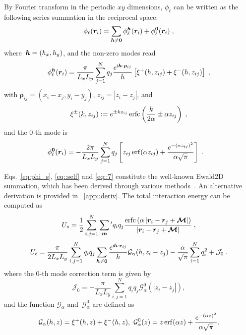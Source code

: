 \begin{lem}\label{thm::SpectralExpansion}
	By Fourier transform in the periodic $xy$ dimensions, $\phi_{\ell}$ can be written as the following series summation in the reciprocal space:
	\begin{equation}\label{eq::7} 
		\phi_{\ell}(\bm{r}_{i}) = \sum_{\boldsymbol{h} \neq \bm{0}} \phi_{\ell}^{\boldsymbol{h}}(\bm{r}_{i}) + \phi_{\ell}^{\bm{0}}(\bm{r}_{i})\;,
	\end{equation}
	where~$\boldsymbol{h} = (h_x, h_y)$, and the non-zero modes read
	\begin{equation}\label{eq:philk}
		\phi_{\ell}^{\boldsymbol{h}}(\bm{r}_{i}) = \frac{\pi}{L_x L_y} \sum_{j = 1}^N q_{j} \frac{e^{\mathrm{i} \boldsymbol{h} \cdot \boldsymbol{\rho}_{ij}}}{h} \left[\xi^{+}(h, z_{ij})+\xi^{-}(h, z_{ij})\right]\;,
	\end{equation}
	with $\bm{\rho}_{ij}=(x_{i}-x_{j},y_{i}-y_{j})$, $z_{ij}=|z_{i}-z_{j}|$, and
	\begin{equation}\label{eq::9}
		\xi^{\pm}(k, z_{ij}) := e^{\pm k z_{ij}} \operatorname{erfc} \left( \frac{k}{2 \alpha} \pm \alpha z_{ij}\right)\;,
	\end{equation} 
	and the 0-th mode is
	\begin{align}\label{eq:phil0}
		\phi_{\ell}^{\bm{0}}(\bm{r}_{i}) &= -\frac{2\pi}{L_x L_y} \sum_{j = 1}^N q_{j} \left[ {z_{ij}} \operatorname{erf}(\alpha {z_{ij}}) + \frac{e^{-(\alpha z_{ij})^2}}{\alpha \sqrt{\pi}}  \right]\;.
	\end{align}
\end{lem}

Eqs.~\eqref{eq:phi_s}, \eqref{eq::self} and \eqref{eq::7} constitute the well-known Ewald2D summation, which has been derived through various methods~\cite{parry1975electrostatic,tornberg2016ewald,heyes1977molecular,de1979electrostatic,PhysRevB.61.6706}.
An alternative derivation is provided in ~\ref{app::deriv}.
The total interaction energy can be computed as
\begin{equation}\label{eq::Us_Ewald2D}
    U_{s} =  \frac{1}{2} \sum_{i,j=1}^N \sum_{\bm{m}}{}^\prime q_i q_{j} \frac{\text{erfc}\left(\alpha \left|\bm{r}_i - \bm{r}_{j} + \boldsymbol{\mathcal{M}}\right|\right)}{\left|\bm{r}_i-\bm{r}_{j} + \boldsymbol{\mathcal{M}}\right|}\;,
\end{equation}
\begin{equation}\label{eq::Ul_Ewald2D}
    U_{\ell} =  \frac{\pi}{2L_xL_y}\sum_{i, j=1}^N  q_iq_{j} \sum_{\boldsymbol{h}\neq \boldsymbol{0}}\frac{e^{\mathsf i \boldsymbol{h}\cdot \boldsymbol{r}_{ij}}}{h}\mathcal{G}_{\alpha}(h,z_i - z_{j})  - \frac{\alpha}{\sqrt{\pi}}\sum_{i=1}^{N}q_i^2+\mathcal{J}_0\;.
\end{equation}
where the 0-th mode correction term is given by
\begin{equation}\label{eq::J0_Ewald2D}
\mathcal J_0 = -\frac{\pi}{L_xL_y}\sum_{i,j=1}^{N} q_iq_{j}\mathcal{G}_{\alpha}^0(|z_i-z_{j}|),
\end{equation}
and the function $\mathcal{G}_{\alpha}$ and~$\mathcal{G}_{\alpha}^0$ are defined as
\begin{equation}\label{eq::G_Ewald2D}
    \mathcal{G}_{\alpha}(h,z) = \xi^{+}(h, z)+\xi^{-}(h, z),~\mathcal{G}_{\alpha}^0(z) = {z} \operatorname{erf}(\alpha {z}) + \frac{e^{-(\alpha z)^2}}{\alpha \sqrt{\pi}}.
\end{equation}


